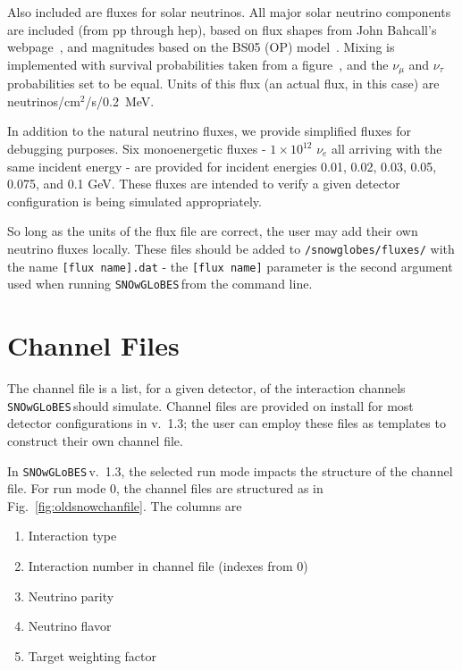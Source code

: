 \documentclass{article}
\newcommand{\snow}{\texttt{SNOwGLoBES}\,}
\begin{document}
Also included are fluxes for solar neutrinos. All major solar neutrino components are included (from pp through hep), based on flux shapes from John Bahcall's webpage~\cite{bahcall_webpage}, and magnitudes based on the BS05 (OP)  model~\cite{Bahcall:2004pz}. Mixing is implemented with survival probabilities taken from a figure~\cite{Berryman:2014qha}, and the $\nu_{\mu}$ and $\nu_{\tau}$ probabilities set to be equal. Units of this flux (an actual flux, in this case) are neutrinos/cm$^{2}$/s/0.2~MeV.

In addition to the natural neutrino fluxes, we provide simplified fluxes for debugging purposes. Six monoenergetic fluxes - $1 \times 10^{12}$ $\nu_e$ all arriving with the same incident energy - are provided for incident energies 0.01, 0.02, 0.03, 0.05, 0.075, and 0.1 GeV. These fluxes are intended to verify a given detector configuration is being simulated appropriately.

So long as the units of the flux file are correct, the user may add their own neutrino fluxes locally. These files should be added to \texttt{/snowglobes/fluxes/} with the name \texttt{[flux name].dat} - the \texttt{[flux name]} parameter is the second argument used when running \snow from the command line.


\section{Channel Files} \label{sec:chanfile}

The channel file is a list, for a given detector, of the interaction channels \snow should simulate. Channel files are provided on install for most detector configurations in v.~1.3; the user can employ these files as templates to construct their own channel file.

In \snow v.~1.3, the selected run mode impacts the structure of the channel file. For run mode 0, the channel files are structured as in Fig.~\ref{fig:oldsnowchanfile}. The columns are

\begin{adjustwidth}{2cm}{}
    \begin{enumerate}
        \item Interaction type
        \item Interaction number in channel file (indexes from 0)
        \item Neutrino parity
        \item Neutrino flavor
        \item Target weighting factor
    \end{enumerate}
\end{adjustwidth}
\end{document}
